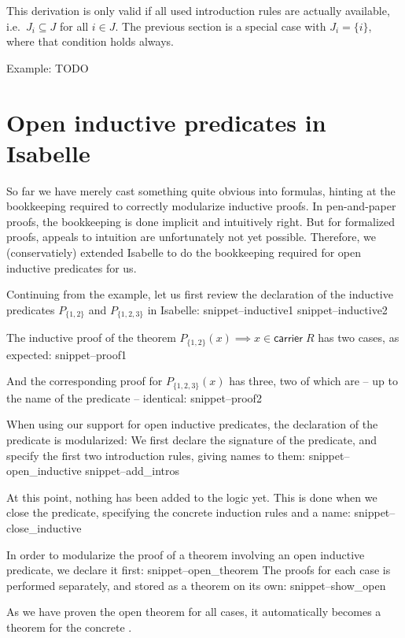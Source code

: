 \documentclass{llncs}
\newcommand{\carrier}[1]{\mathsf{carrier}\;#1}
\newcommand{\Snippet}[1]{\csname snippet--#1\endcsname}
\begin{document}
This derivation is only valid if all used introduction rules are actually available, i.e.\ $J_i \subseteq J$ for all $i\in J$.  The previous section is a special case with $J_i=\{i\}$, where that condition holds always.


Example: TODO

\section{Open inductive predicates in Isabelle}

So far we have merely cast something quite obvious into formulas, hinting at the bookkeeping required to correctly modularize inductive proofs. In pen-and-paper proofs, the bookkeeping is done implicit and intuitively right. But for formalized proofs, appeals to intuition are unfortunately not yet possible. Therefore, we (conservatiely) extended Isabelle to do the bookkeeping required for open inductive predicates for us.

Continuing from the example, let us first review the declaration of the inductive predicates $P_{\{1,2\}}$ and $P_{\{1,2,3\}}$ in Isabelle:
\Snippet{inductive1}
\Snippet{inductive2}

The inductive proof of the theorem $P_{\{1,2\}}(x) \implies x\in \carrier R$ has two cases, as expected:
\Snippet{proof1}

And the corresponding proof for $P_{\{1,2,3\}}(x)$ has three, two of which are -- up to the name of the predicate -- identical:
\Snippet{proof2}

When using our support for open inductive predicates, the declaration of the predicate is modularized: We first declare the signature of the predicate, and specify the first two introduction rules, giving names to them:
\Snippet{open_inductive}
\Snippet{add_intros}

At this point, nothing has been added to the logic yet. This is done when we close the predicate, specifying the concrete induction rules and a name:
\Snippet{close_inductive}

In order to modularize the proof of a theorem involving an open inductive predicate, we declare it first:
\Snippet{open_theorem}
The proofs for each case is performed separately, and stored as a theorem on its own:
\Snippet{show_open}

As we have proven the open theorem for all cases, it automatically becomes a theorem for the concrete .
\end{document}
